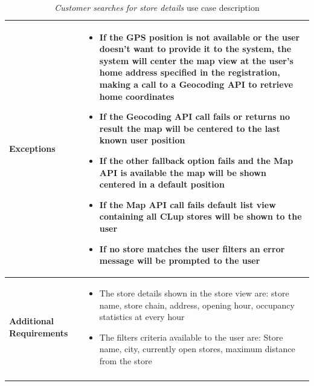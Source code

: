 \begin{longtable}{p{0.25\linewidth}p{0.75\linewidth}}
    \midrule
    \textbf{Exceptions}                       &
    \begin{itemize}
        \item If the GPS position is not available or the user doesn't want to provide it to the system, the system will center the map view at the user's home address specified in the registration, making a call to a Geocoding API to retrieve home coordinates
        \item If the Geocoding API call fails or returns no result the map will be centered to the last known user position
        \item If the other fallback option fails and the Map API is available the map will be shown centered in a default position
        \item If the Map API call fails default list view containing all CLup stores will be shown to the user
        \item If no store matches the user filters an error message will be prompted to the user
    \end{itemize}                                                                    \\
    \midrule
    \textbf{Additional \newline Requirements} &
    \begin{itemize}
        \item The store details shown in the store view are: store name, store chain, address, opening hour, occupancy statistics at every hour
        \item The filters criteria available to the user are: Store name, city, currently open stores, maximum distance from the store
    \end{itemize}                                                                    \\
    \bottomrule
    \caption{\emph{Customer searches for store details} use case description}
\end{longtable}

